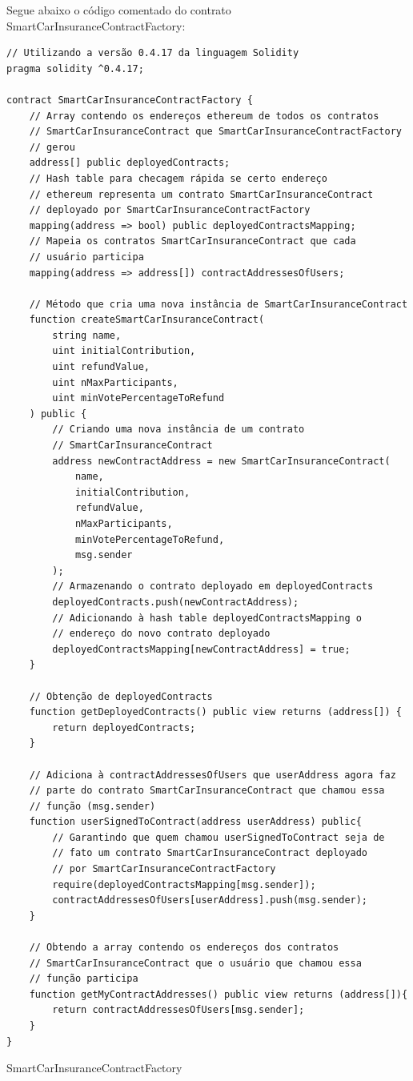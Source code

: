 Segue abaixo o código comentado do contrato SmartCarInsuranceContractFactory:

\begin{code}
\begin{verbatim}
// Utilizando a versão 0.4.17 da linguagem Solidity
pragma solidity ^0.4.17;

contract SmartCarInsuranceContractFactory {
    // Array contendo os endereços ethereum de todos os contratos 
    // SmartCarInsuranceContract que SmartCarInsuranceContractFactory 
    // gerou
    address[] public deployedContracts;
    // Hash table para checagem rápida se certo endereço 
    // ethereum representa um contrato SmartCarInsuranceContract 
    // deployado por SmartCarInsuranceContractFactory
    mapping(address => bool) public deployedContractsMapping;
    // Mapeia os contratos SmartCarInsuranceContract que cada 
    // usuário participa
    mapping(address => address[]) contractAddressesOfUsers;

    // Método que cria uma nova instância de SmartCarInsuranceContract
    function createSmartCarInsuranceContract(
        string name,
        uint initialContribution,
        uint refundValue,
        uint nMaxParticipants,
        uint minVotePercentageToRefund
    ) public {
        // Criando uma nova instância de um contrato 
        // SmartCarInsuranceContract
        address newContractAddress = new SmartCarInsuranceContract(
            name,
            initialContribution,
            refundValue,
            nMaxParticipants,
            minVotePercentageToRefund, 
            msg.sender
        );
        // Armazenando o contrato deployado em deployedContracts
        deployedContracts.push(newContractAddress);
        // Adicionando à hash table deployedContractsMapping o 
        // endereço do novo contrato deployado
        deployedContractsMapping[newContractAddress] = true;
    }

    // Obtenção de deployedContracts
    function getDeployedContracts() public view returns (address[]) {
        return deployedContracts;
    }

    // Adiciona à contractAddressesOfUsers que userAddress agora faz 
    // parte do contrato SmartCarInsuranceContract que chamou essa 
    // função (msg.sender)
    function userSignedToContract(address userAddress) public{
        // Garantindo que quem chamou userSignedToContract seja de 
        // fato um contrato SmartCarInsuranceContract deployado 
        // por SmartCarInsuranceContractFactory
        require(deployedContractsMapping[msg.sender]);
        contractAddressesOfUsers[userAddress].push(msg.sender);
    }

    // Obtendo a array contendo os endereços dos contratos 
    // SmartCarInsuranceContract que o usuário que chamou essa 
    // função participa
    function getMyContractAddresses() public view returns (address[]){
        return contractAddressesOfUsers[msg.sender];
    }
}
\end{verbatim}
\caption{SmartCarInsuranceContractFactory}
\label{lst:SmartCarInsuranceContractFactory}
\end{code}

